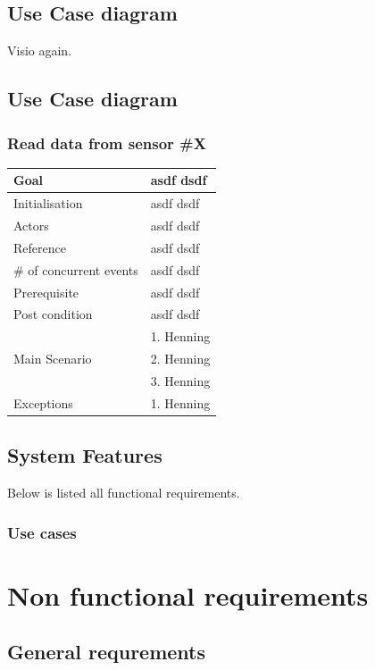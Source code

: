 \subsection{Use Case diagram}
Visio again.

\subsection{Use Case diagram}
\subsubsection{Read data from sensor \#X}
\begin{table}[H]
	\centering
	\begin{tabular}{|l|p{7cm}|}
	\hline
	Goal & asdf dsdf \\ \hline
	Initialisation & asdf dsdf \\ \hline
	Actors & asdf dsdf \\ \hline
	Reference & asdf dsdf \\ \hline
	\# of concurrent events & asdf dsdf \\ \hline
	Prerequisite  & asdf dsdf \\ \hline
	Post condition & asdf dsdf \\ \hline
	\multirow{3}{*}{Main Scenario} & 1. Henning \\
	& 2. Henning\\
	& 3. Henning\\ \hline
	\multirow{1}{*}{Exceptions} & 1. Henning \\ \hline
	\end{tabular}
\end{table}


\subsection{System Features}
Below is listed all functional requirements.

\subsubsection{Use cases}
\section{Non functional requirements}

\subsection{General requrements}

